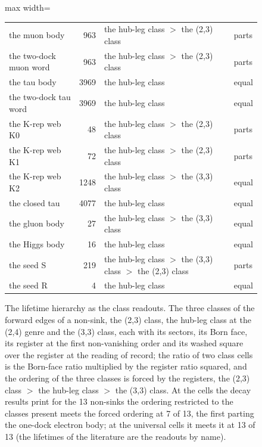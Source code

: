\begin{figure}[htbp]
{\begin{adjustbox}{max width=\linewidth}
\begin{tabular}{p{44mm}rp{52mm}p{24mm}}
the muon body & 963 & the hub-leg class $>$ the (2,3) class & parts \\
the two-dock muon word & 963 & the hub-leg class $>$ the (2,3) class & parts \\
the tau body & 3969 & the hub-leg class & equal \\
the two-dock tau word & 3969 & the hub-leg class & equal \\
the K-rep web K0 & 48 & the hub-leg class $>$ the (2,3) class & parts \\
the K-rep web K1 & 72 & the hub-leg class $>$ the (2,3) class & parts \\
the K-rep web K2 & 1248 & the hub-leg class $>$ the (3,3) class & equal \\
the closed tau & 4077 & the hub-leg class & equal \\
the gluon body & 27 & the hub-leg class $>$ the (3,3) class & equal \\
the Higgs body & 16 & the hub-leg class & equal \\
the seed S & 219 & the hub-leg class $>$ the (3,3) class $>$ the (2,3) class & parts \\
the seed R & 4 & the hub-leg class & equal \\
\end{tabular}\end{adjustbox}}
\caption{The lifetime hierarchy as the class readouts. The three classes of the forward edges of a non-sink, the (2,3) class, the hub-leg class at the (2,4) genre and the (3,3) class, each with its sectors, its Born face, its register at the first non-vanishing order and its washed square over the register at the reading of record; the ratio of two class cells is the Born-face ratio multiplied by the register ratio squared, and the ordering of the three classes is forced by the registers, the (2,3) class $>$ the hub-leg class $>$ the (3,3) class. At the cells the decay results print for the 13 non-sinks the ordering restricted to the classes present meets the forced ordering at 7 of 13, the first parting the one-dock electron body; at the universal cells it meets it at 13 of 13 (the lifetimes of the literature are the readouts by name).}\label{fig:lifetime-hierarchy}
\end{figure}
